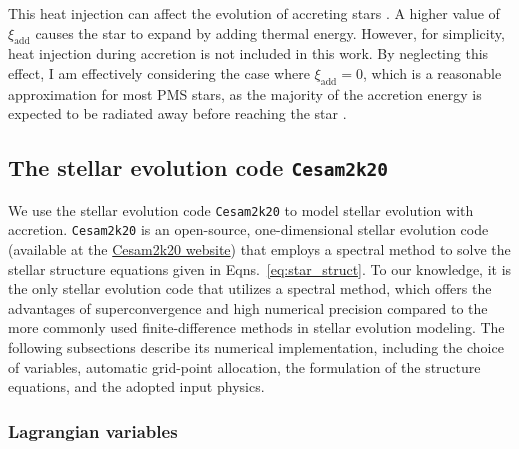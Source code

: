 \documentclass[12pt,a4paper]{article}
\newcommand{\mr}{\mathrm}
\begin{document}
This heat injection can affect the evolution of accreting stars \parencite[e.g., ][]{KunitomoEtAl2017,AmardMatt2023}. A higher value of $\xi_\mathrm{add}$ causes the star to expand by adding thermal energy. However, for simplicity, heat injection during accretion is not included in this work. By neglecting this effect, I am effectively considering the case where $\xi_\mr{add} = 0$, which is a reasonable approximation for most PMS stars, as the majority of the accretion energy is expected to be radiated away before reaching the star \parencite{HartmannEtAl1998}.



\subsection{The stellar evolution code \texttt{Cesam2k20}}
\label{sec:cesam2k20}

We use the stellar evolution code \texttt{Cesam2k20} \parencite{MarquesEtAl2013,MorelLebreton2008,Morel1997} to model stellar evolution with accretion. \texttt{Cesam2k20} is an open-source, one-dimensional stellar evolution code (available at the \href{https://www.ias.u-psud.fr/cesam2k20/home.html}{Cesam2k20 website}) that employs a spectral method to solve the stellar structure equations given in Eqns.~\eqref{eq:star_struct}. To our knowledge, it is the only stellar evolution code that utilizes a spectral method, which offers the advantages of superconvergence and high numerical precision compared to the more commonly used finite-difference methods in stellar evolution modeling. The following subsections describe its numerical implementation, including the choice of variables, automatic grid-point allocation, the formulation of the structure equations, and the adopted input physics.

\subsubsection{Lagrangian variables}
\label{sec:cesam2k20_variables}
\end{document}
